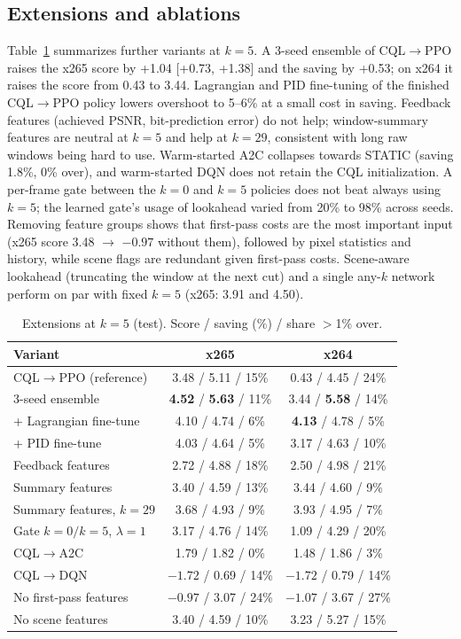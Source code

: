 \documentclass[conference]{IEEEtran}
\newcommand{\cqlppo}{CQL$\to$PPO}
\begin{document}
\subsection{Extensions and ablations}
Table~\ref{tab:ext} summarizes further variants at $k{=}5$. A 3-seed ensemble of \cqlppo{} raises the x265 score by +1.04 [+0.73, +1.38] and the saving by +0.53; on x264 it raises the score from 0.43 to 3.44. Lagrangian and PID fine-tuning of the finished \cqlppo{} policy lowers overshoot to 5--6\% at a small cost in saving. Feedback features (achieved PSNR, bit-prediction error) do not help; window-summary features are neutral at $k{=}5$ and help at $k{=}29$, consistent with long raw windows being hard to use. Warm-started A2C collapses towards STATIC (saving 1.8\%, 0\% over), and warm-started DQN does not retain the CQL initialization. A per-frame gate between the $k{=}0$ and $k{=}5$ policies does not beat always using $k{=}5$; the learned gate's usage of lookahead varied from 20\% to 98\% across seeds. Removing feature groups shows that first-pass costs are the most important input (x265 score 3.48 $\to$ $-0.97$ without them), followed by pixel statistics and history, while scene flags are redundant given first-pass costs. Scene-aware lookahead (truncating the window at the next cut) and a single any-$k$ network perform on par with fixed $k{=}5$ (x265: 3.91 and 4.50).

\begin{table}[t]
\centering\footnotesize
\caption{Extensions at $k{=}5$ (test). Score / saving (\%) / share $>$1\% over.}
\label{tab:ext}
\setlength{\tabcolsep}{2.5pt}
\begin{tabular}{@{}lcc@{}}
\toprule
Variant & x265 & x264\\
\midrule
\cqlppo{} (reference) & 3.48 / 5.11 / 15\% & 0.43 / 4.45 / 24\%\\
3-seed ensemble & \textbf{4.52} / \textbf{5.63} / 11\% & 3.44 / \textbf{5.58} / 14\%\\
+ Lagrangian fine-tune & 4.10 / 4.74 / 6\% & \textbf{4.13} / 4.78 / 5\%\\
+ PID fine-tune & 4.03 / 4.64 / 5\% & 3.17 / 4.63 / 10\%\\
Feedback features & 2.72 / 4.88 / 18\% & 2.50 / 4.98 / 21\%\\
Summary features & 3.40 / 4.59 / 13\% & 3.44 / 4.60 / 9\%\\
Summary features, $k{=}29$ & 3.68 / 4.93 / 9\% & 3.93 / 4.95 / 7\%\\
Gate $k{=}0/k{=}5$, $\lambda{=}1$ & 3.17 / 4.76 / 14\% & 1.09 / 4.29 / 20\%\\
CQL$\to$A2C & 1.79 / 1.82 / 0\% & 1.48 / 1.86 / 3\%\\
CQL$\to$DQN & $-1.72$ / 0.69 / 14\% & $-1.72$ / 0.79 / 14\%\\
No first-pass features & $-0.97$ / 3.07 / 24\% & $-1.07$ / 3.67 / 27\%\\
No scene features & 3.40 / 4.59 / 10\% & 3.23 / 5.27 / 15\%\\
\bottomrule
\end{tabular}
\end{table}
\end{document}
